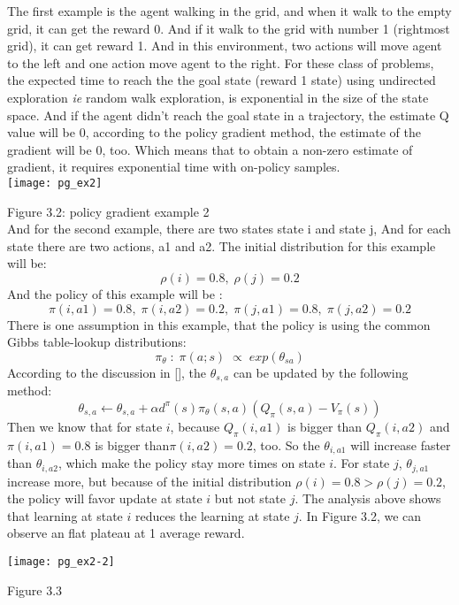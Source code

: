 \begin{itemize}
The first example is the agent walking in the grid, and when it walk to the empty
grid, it can get the reward 0. And if it walk to the grid with number 1 (rightmost grid), it can get reward 1. And in this environment, two actions will move agent to the left and one action move agent to the right. For these class of problems, the expected time to reach the the goal state (reward 1 state) using undirected exploration \emph{ie} random walk exploration, is exponential in the size of the state space. And if the agent didn't reach the goal state in a trajectory, the estimate Q value will be 0, according to the policy gradient method, the estimate of the gradient will be 0, too. Which means that to obtain
a non-zero estimate of gradient, it requires exponential time with on-policy
samples.\\

\texttt{[image: pg\_ex2]}

Figure 3.2: policy gradient example 2 \\

And for the second example, there are two states state i and state j, And for each state there are two actions, a1 and a2. The initial distribution for this example will be:
\[ \rho(i) = 0.8, \; \rho(j) = 0.2 \]
And the policy of this example will be : \\
\[\pi(i,a1)=0.8, \; \pi(i,a2)=0.2, \; \pi(j,a1)=0.8, \; \pi(j,a2)=0.2\]
There is one assumption in this example, that the policy is using the common Gibbs table-lookup distributions:
\[{\pi_{\theta} \; : \;\pi(a;s) \; \propto \; exp(\theta_{sa})}\]
According to the discussion in [\cite{DBLP:ShipraAgrawalRLLecture7}], the $\theta_{s,a}$ can be updated by the following method:
\[\theta_{s,a} \gets \theta_{s,a} + \alpha d^{\pi}(s) \pi_{\theta}(s,a) 
(Q_{\pi}(s,a) - V_{\pi}(s))\]
Then we know that for state $i$, because $Q_{\pi}(i, a1)$ is bigger than 
$Q_{\pi}(i, a2)$ and $\pi(i,a1)=0.8$ is bigger than$ \pi(i,a2)=0.2$, too. So
the $\theta_{i,a1}$ will increase faster than $\theta_{i,a2}$, which make the
policy stay more times on state $i$. For state $j$, $\theta_{j,a1}$ increase more, but because of the initial distribution  $\rho(i) = 0.8 > \rho(j) = 0.2$, the policy will favor update at state $i$ but not state $j$. The analysis above
shows that learning at state $i$ reduces the learning at state $j$.
In Figure 3.2, we can observe an flat plateau at 1 average reward.

\texttt{[image: pg\_ex2-2]}

Figure 3.3 \\


\end{itemize}
